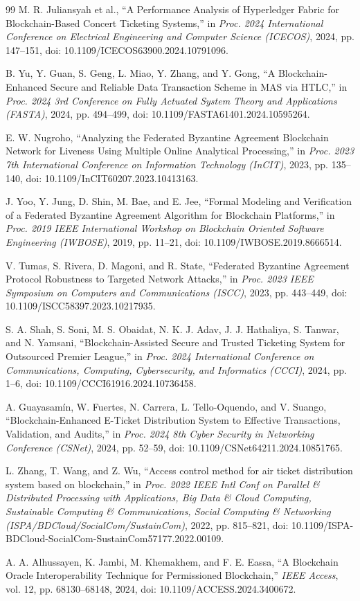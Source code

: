 \documentclass[12pt,a4paper]{article}
\begin{document}
\begin{thebibliography}{99}
M. R. Juliansyah et al., ``A Performance Analysis of Hyperledger Fabric for Blockchain-Based Concert Ticketing Systems,'' in \textit{Proc. 2024 International Conference on Electrical Engineering and Computer Science (ICECOS)}, 2024, pp. 147--151, doi: 10.1109/ICECOS63900.2024.10791096.

B. Yu, Y. Guan, S. Geng, L. Miao, Y. Zhang, and Y. Gong, ``A Blockchain-Enhanced Secure and Reliable Data Transaction Scheme in MAS via HTLC,'' in \textit{Proc. 2024 3rd Conference on Fully Actuated System Theory and Applications (FASTA)}, 2024, pp. 494--499, doi: 10.1109/FASTA61401.2024.10595264.

E. W. Nugroho, ``Analyzing the Federated Byzantine Agreement Blockchain Network for Liveness Using Multiple Online Analytical Processing,'' in \textit{Proc. 2023 7th International Conference on Information Technology (InCIT)}, 2023, pp. 135--140, doi: 10.1109/InCIT60207.2023.10413163.

J. Yoo, Y. Jung, D. Shin, M. Bae, and E. Jee, ``Formal Modeling and Verification of a Federated Byzantine Agreement Algorithm for Blockchain Platforms,'' in \textit{Proc. 2019 IEEE International Workshop on Blockchain Oriented Software Engineering (IWBOSE)}, 2019, pp. 11--21, doi: 10.1109/IWBOSE.2019.8666514.

V. Tumas, S. Rivera, D. Magoni, and R. State, ``Federated Byzantine Agreement Protocol Robustness to Targeted Network Attacks,'' in \textit{Proc. 2023 IEEE Symposium on Computers and Communications (ISCC)}, 2023, pp. 443--449, doi: 10.1109/ISCC58397.2023.10217935.

S. A. Shah, S. Soni, M. S. Obaidat, N. K. J. Adav, J. J. Hathaliya, S. Tanwar, and N. Yamsani, ``Blockchain-Assisted Secure and Trusted Ticketing System for Outsourced Premier League,'' in \textit{Proc. 2024 International Conference on Communications, Computing, Cybersecurity, and Informatics (CCCI)}, 2024, pp. 1--6, doi: 10.1109/CCCI61916.2024.10736458.

A. Guayasamín, W. Fuertes, N. Carrera, L. Tello-Oquendo, and V. Suango, ``Blockchain-Enhanced E-Ticket Distribution System to Effective Transactions, Validation, and Audits,'' in \textit{Proc. 2024 8th Cyber Security in Networking Conference (CSNet)}, 2024, pp. 52--59, doi: 10.1109/CSNet64211.2024.10851765.

L. Zhang, T. Wang, and Z. Wu, ``Access control method for air ticket distribution system based on blockchain,'' in \textit{Proc. 2022 IEEE Intl Conf on Parallel \& Distributed Processing with Applications, Big Data \& Cloud Computing, Sustainable Computing \& Communications, Social Computing \& Networking (ISPA/BDCloud/SocialCom/SustainCom)}, 2022, pp. 815--821, doi: 10.1109/ISPA-BDCloud-SocialCom-SustainCom57177.2022.00109.

A. A. Alhussayen, K. Jambi, M. Khemakhem, and F. E. Eassa, ``A Blockchain Oracle Interoperability Technique for Permissioned Blockchain,'' \textit{IEEE Access}, vol. 12, pp. 68130--68148, 2024, doi: 10.1109/ACCESS.2024.3400672.

\end{thebibliography}
\end{document}
